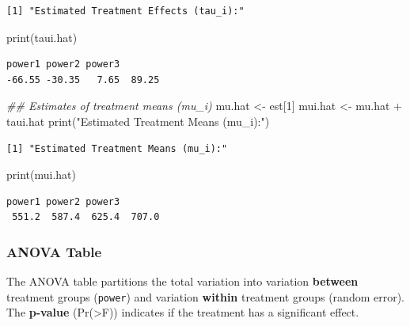 \documentclass[
  letterpaper,
]{scrbook}
\newenvironment{Shaded}{\begin{snugshade}}{\end{snugshade}}
\newcommand{\DecValTok}[1]{\textcolor[rgb]{0.68,0.00,0.00}{#1}}
\newcommand{\DocumentationTok}[1]{\textcolor[rgb]{0.37,0.37,0.37}{\textit{#1}}}
\newcommand{\FunctionTok}[1]{\textcolor[rgb]{0.28,0.35,0.67}{#1}}
\newcommand{\NormalTok}[1]{\textcolor[rgb]{0.00,0.23,0.31}{#1}}
\newcommand{\OtherTok}[1]{\textcolor[rgb]{0.00,0.23,0.31}{#1}}
\newcommand{\SpecialCharTok}[1]{\textcolor[rgb]{0.37,0.37,0.37}{#1}}
\newcommand{\StringTok}[1]{\textcolor[rgb]{0.13,0.47,0.30}{#1}}
\begin{document}
\begin{verbatim}
[1] "Estimated Treatment Effects (tau_i):"
\end{verbatim}

\begin{Shaded}
\begin{Highlighting}[]
\FunctionTok{print}\NormalTok{(taui.hat)}
\end{Highlighting}
\end{Shaded}

\begin{verbatim}
power1 power2 power3        
-66.55 -30.35   7.65  89.25 
\end{verbatim}

\begin{Shaded}
\begin{Highlighting}[]
\DocumentationTok{\#\# Estimates of treatment means (mu\_i)}
\NormalTok{mu.hat }\OtherTok{\textless{}{-}}\NormalTok{ est[}\DecValTok{1}\NormalTok{]}
\NormalTok{mui.hat }\OtherTok{\textless{}{-}}\NormalTok{ mu.hat }\SpecialCharTok{+}\NormalTok{ taui.hat}
\FunctionTok{print}\NormalTok{(}\StringTok{"Estimated Treatment Means (mu\_i):"}\NormalTok{)}
\end{Highlighting}
\end{Shaded}

\begin{verbatim}
[1] "Estimated Treatment Means (mu_i):"
\end{verbatim}

\begin{Shaded}
\begin{Highlighting}[]
\FunctionTok{print}\NormalTok{(mui.hat)}
\end{Highlighting}
\end{Shaded}

\begin{verbatim}
power1 power2 power3        
 551.2  587.4  625.4  707.0 
\end{verbatim}

\subsubsection{ANOVA Table}\label{anova-table}

The ANOVA table partitions the total variation into variation
\textbf{between} treatment groups (\texttt{power}) and variation
\textbf{within} treatment groups (random error). The \textbf{p-value}
(Pr(\textgreater F)) indicates if the treatment has a significant
effect.
\end{document}
